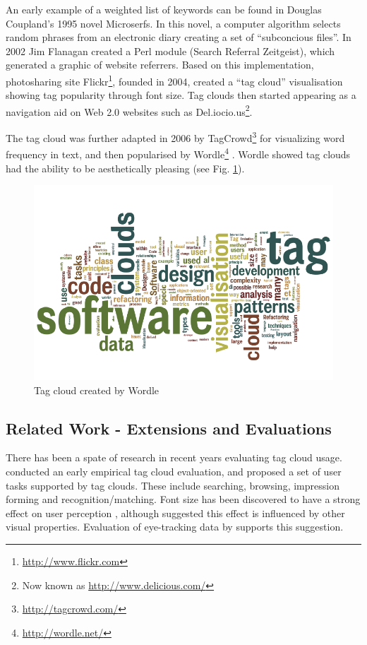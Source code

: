 An early example of a weighted list of keywords can be found in Douglas Coupland's 1995 novel Microserfs. In this novel, a computer algorithm selects random phrases from an electronic diary creating a set of ``subconcious files''. In 2002 Jim Flanagan created a Perl module (Search Referral Zeitgeist), which generated a graphic of website referrers. Based on this implementation, photosharing site Flickr\footnote{\url{http://www.flickr.com}}, founded in 2004, created a ``tag cloud'' visualisation showing tag popularity through font size. Tag clouds then started appearing as a navigation aid on Web 2.0 websites such as Del.iocio.us\footnote{Now known as \url{http://www.delicious.com/}}.

The tag cloud was further adapted in 2006 by TagCrowd\footnote{\url{http://tagcrowd.com/}} for visualizing word frequency in text, and then popularised by Wordle\footnote{\url{http://wordle.net/}} \citep{feinberg10}. Wordle showed tag clouds had the ability to be aesthetically pleasing (see Fig. \ref{fig:wordle}).

\begin{figure}[h!]
   	\centering
   	\includegraphics[width=140mm]{thesistagcloud.png}
  	\caption{Tag cloud created by Wordle}
	\label{fig:wordle}	
\end{figure}

\subsection{Related Work - Extensions and Evaluations}

There has been a spate of research in recent years evaluating tag cloud usage. \citet{rivadeneira07} conducted an early empirical tag cloud evaluation, and proposed a set of user tasks supported by tag clouds. These include searching, browsing, impression forming and recognition/matching. Font size has been discovered to have a strong effect on user perception \citep[]{rivadeneira07, bateman08, halvey07}, although \citet{bateman08} suggested this effect is influenced by other visual properties. Evaluation of eye-tracking data by \citet{lohmann09} supports this suggestion.

